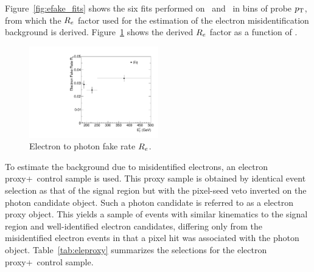 Figure~\ref{fig:efake_fits} shows the six fits performed on \Pe\Pe\ and \Pe\Pgg\ in bins of probe $p_{\mathrm{T}}$, from which the $R_{{e}}$ factor used for the estimation of the electron misidentification background is derived.
Figure~\ref{fig:efake_frate} shows the derived $R_{{e}}$ factor as a function of \ETg.

\begin{figure}[htbp]
\centering
    \includegraphics[width=0.5\textwidth]{Analysis/Figures/efake/frate_data_ptalt.pdf} 
    \caption{
      Electron to photon fake rate $R_{{e}}$.
    }
    \label{fig:efake_frate}
\end{figure}

To estimate the background due to misidentified electrons, an electron proxy+\met\ control sample is used.
This proxy sample is obtained by identical event selection as that of the signal region but with the pixel-seed veto inverted on the photon candidate object.
Such a photon candidate is referred to as a electron proxy object.
This yields a sample of events with similar kinematics to the signal region and well-identified electron candidates, differing only from the misidentified electron events in that a pixel hit was associated with the photon object.
Table~\ref{tab:eleproxy} summarizes the selections for the electron proxy+\met\ control sample. 

